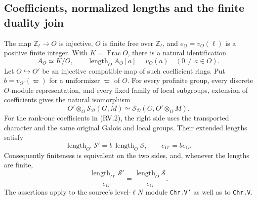 \subsection{Coefficients, normalized lengths and the finite duality join}

\begin{proposition}
\label{claim:RV1}
The map $\mathbb Z_\ell\to O$ is injective, $O$ is finite free over
$\mathbb Z_\ell$, and $e_O=v_O(\ell)$ is a positive finite integer.
With $K=\operatorname{Frac}O$, there is a natural identification
\[
             A_O\simeq K/O,\qquad
 \operatorname{length}_O A_O[a]=v_O(a)\quad(0\ne a\in O).
 \tag{RV.4}
\]
Let $O\hookrightarrow O'$ be an injective compatible map of such
coefficient rings.  Put $b=v_{O'}(\varpi)$ for a uniformizer
$\varpi$ of $O$.  For every profinite group, every discrete
$O$-module representation, and every fixed family of local
subgroups, extension of coefficients gives the natural isomorphism
\[
 O'\otimes_O\mathcal S_{\mathscr D}(G,M)
       \simeq\mathcal S_{\mathscr D}(G,O'\otimes_O M).
 \tag{RV.5}
\]
For the rank-one coefficients in (RV.2), the right side uses the
transported character and the same original Galois and local groups.
Their extended lengths satisfy
\[
 \operatorname{length}_{O'}\mathcal S'
       =b\,\operatorname{length}_O\mathcal S,\qquad
 e_{O'}=b e_O.
 \tag{RV.6}
\]
Consequently finiteness is equivalent on the two sides, and, whenever
the lengths are finite,
\[
       \frac{\operatorname{length}_{O'}\mathcal S'}{e_{O'}}
          =\frac{\operatorname{length}_O\mathcal S}{e_O}.
 \tag{RV.7}
\]
The assertions apply to the source's level-$\ell N$ module
\texttt{Chr.V'} as well as to \texttt{Chr.V}.
\end{proposition}

